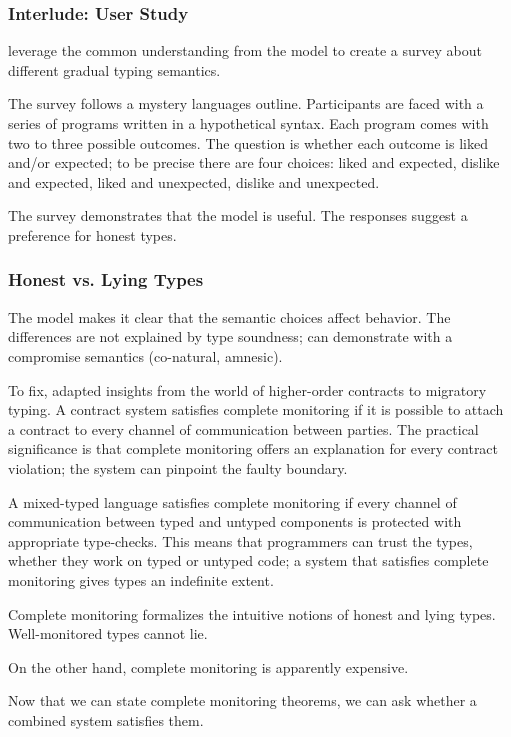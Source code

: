 \subsubsection{Interlude: User Study}

\citet{tgpk-dls-2018} leverage the common understanding from the model
 to create a survey about different gradual typing semantics.

The survey follows a mystery languages outline.
Participants are faced with a series of programs written in a hypothetical
 syntax.
Each program comes with two to three possible outcomes.
The question is whether each outcome is liked and/or expected; to be precise
 there are four choices: liked and expected, dislike and expected,
 liked and unexpected, dislike and unexpected.

The survey demonstrates that the model is useful.
The responses suggest a preference for honest types.



\subsubsection{Honest vs. Lying Types}

The model makes it clear that the semantic choices affect behavior.
The differences are not explained by type soundness; can demonstrate
 with a compromise semantics (co-natural, amnesic).


To fix, adapted insights from the world of higher-order contracts to migratory
 typing.
A contract system satisfies complete monitoring if it is possible to attach
 a contract to every channel of communication between parties.
The practical significance is that complete monitoring offers an explanation
 for every contract violation; the system can pinpoint the faulty boundary.

A mixed-typed language satisfies complete monitoring if every channel of
 communication between typed and untyped components is protected with
 appropriate type-checks.
This means that programmers can trust the types,
 whether they work on typed or untyped code;
 a system that satisfies complete monitoring gives types an indefinite extent.

Complete monitoring formalizes the intuitive notions of honest and lying types.
Well-monitored types cannot lie.

On the other hand, complete monitoring is apparently expensive.

Now that we can state complete monitoring theorems, we can ask whether a combined
system satisfies them.

